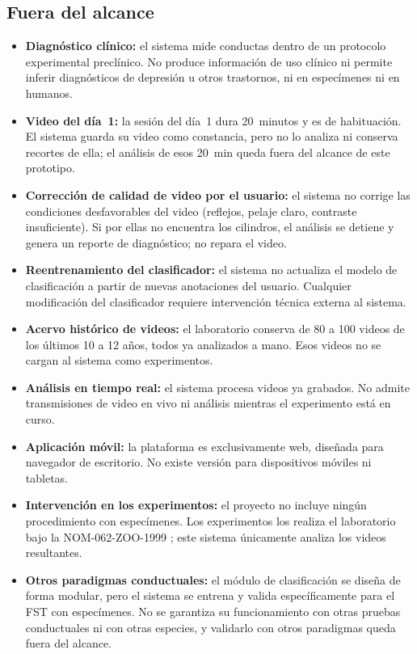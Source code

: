 \subsection*{Fuera del alcance}
\begin{itemize}
  \item \textbf{Diagnóstico clínico:} el sistema mide conductas dentro de un protocolo
        experimental preclínico. No produce información de uso clínico ni permite
        inferir diagnósticos de depresión u otros trastornos, ni en especímenes ni en
        humanos.

  \item \textbf{Video del día~1:} la sesión del día~1 dura 20~minutos y es de
        habituación. El sistema guarda su video como constancia, pero no lo analiza ni
        conserva recortes de ella; el análisis de esos 20~min queda fuera del alcance de
        este prototipo.

  \item \textbf{Corrección de calidad de video por el usuario:} el sistema no corrige las
        condiciones desfavorables del video (reflejos, pelaje claro, contraste
        insuficiente). Si por ellas no encuentra los cilindros, el análisis se detiene y
        genera un reporte de diagnóstico; no repara el video.

  \item \textbf{Reentrenamiento del clasificador:} el sistema no actualiza el modelo
        de clasificación a partir de nuevas anotaciones del usuario. Cualquier
        modificación del clasificador requiere intervención técnica externa al sistema.

  \item \textbf{Acervo histórico de videos:} el laboratorio conserva de 80 a 100 videos de
        los últimos 10 a 12 años, todos ya analizados a mano. Esos videos no se cargan al
        sistema como experimentos.

  \item \textbf{Análisis en tiempo real:} el sistema procesa videos ya grabados. No
        admite transmisiones de video en vivo ni análisis mientras el experimento está
        en curso.

  \item \textbf{Aplicación móvil:} la plataforma es exclusivamente web, diseñada para
        navegador de escritorio. No existe versión para dispositivos móviles ni tabletas.

  \item \textbf{Intervención en los experimentos:} el proyecto no incluye ningún
        procedimiento con especímenes. Los experimentos los realiza el laboratorio bajo la
        NOM-062-ZOO-1999 \cite{nom062}; este sistema únicamente analiza los videos
        resultantes.

  \item \textbf{Otros paradigmas conductuales:} el módulo de clasificación se diseña de
        forma modular, pero el sistema se entrena y valida específicamente para el FST con
        especímenes. No se garantiza su funcionamiento con otras pruebas conductuales ni
        con otras especies, y validarlo con otros paradigmas queda fuera del alcance.
\end{itemize}

